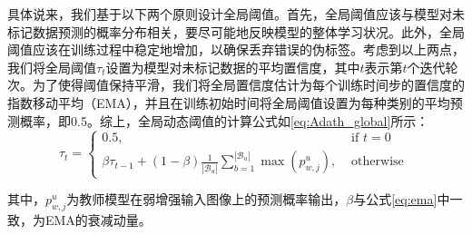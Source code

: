 \documentclass[lang=chs, degree=master, blindreview=false, adobe=false]{yanputhesis}
\begin{document}
具体说来，我们基于以下两个原则设计全局阈值。首先，全局阈值应该与模型对未标记数据预测的概率分布相关，要尽可能地反映模型的整体学习状况。此外，全局阈值应该在训练过程中稳定地增加，以确保丢弃错误的伪标签。考虑到以上两点，我们将全局阈值$\tau_t$设置为模型对未标记数据的平均置信度，其中$t$表示第$t$个迭代轮次。为了使得阈值保持平滑，我们将全局置信度估计为每个训练时间步的置信度的指数移动平均（EMA），并且在训练初始时间将全局阈值设置为每种类别的平均预测概率，即0.5。综上，全局动态阈值的计算公式如\ref{eq:Adath_global}所示：
\begin{equation}
    \label{eq:Adath_global}
    \tau_{t}=\left\{\begin{array}{ll}
      0.5, & \text { if } t=0 \\
      \beta \tau_{t-1}+(1-\beta) \frac{1}{\left|\mathcal{B}_{u}\right|} \sum_{b=1}^{\left|\mathcal{B}_{u}\right|} \max \left(p_{w, j}^{u}\right), & \text { otherwise }
      \end{array}\right.
\end{equation}

其中，$p_{w, j}^{u}$为教师模型在弱增强输入图像上的预测概率输出，$\beta$与公式\ref{eq:ema}中一致，为EMA的衰减动量。
\end{document}
